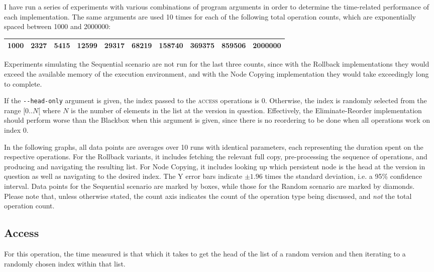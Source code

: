 I have run a series of experiments with various combinations of program
arguments in order to determine the time-related performance of each
implementation. The same arguments are used 10 times for each of the following
total operation counts, which are exponentially spaced between 1000 and 2000000:

\begin{tabular}{|l|l|l|l|l|l|l|l|l|l|}
\hline
1000 & 2327 & 5415 & 12599 & 29317 & 68219 & 158740 & 369375 & 859506 & 2000000\\
\hline
\end{tabular}

Experiments simulating the Sequential scenario are not run for the last three
counts, since with the Rollback implementations they would exceed the available
memory of the execution environment, and with the Node Copying implementation
they would take exceedingly long to complete.

If the \texttt{-\@{}-head-only} argument is given, the index passed to the
\textsc{access} operations is 0. Otherwise, the index is randomly selected from
the range $[0..N[$ where $N$ is the number of elements in the list at the
version in question. Effectively, the Eliminate-Reorder implementation should
perform worse than the Blackbox when this argument is given, since there is no
reordering to be done when all operations work on index 0.

In the following graphs, all data points are averages over 10 runs with
identical parameters, each representing the duration spent on the respective
operations.  For the Rollback variants, it includes fetching the relevant full
copy, pre-processing the sequence of operations, and producing and navigating
the resulting list. For Node Copying, it includes looking up which persistent
node is the head at the version in question as well as navigating to the desired
index. The Y error bars indicate $\pm 1.96$ times the standard deviation, i.e. a
95\% confidence interval. Data points for the Sequential scenario are marked by
boxes, while those for the Random scenario are marked by diamonds. Please note
that, unless otherwise stated, the count axis indicates the count of the
operation type being discussed, and \emph{not} the total operation count.

\subsection{Access}
For this operation, the time measured is that which it takes to get the head of
the list of a random version and then iterating to a randomly chosen index
within that list.

